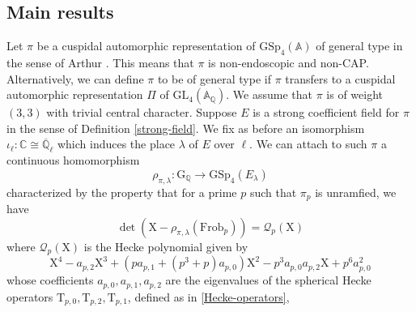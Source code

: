 \documentclass[10pt]{amsart}
\numberwithin{equation}{section}
\theoremstyle{definition}
\def\GL{\mathrm{GL}}
\def\GSp{\mathrm{GSp}}
\def\Frob{\mathrm{Frob}}
\def\calQ{\mathcal{Q}}
\def\CC{\mathbb{C}}
\def\QQ{\mathbb{Q}}
\def\ZZ{\mathbb{Z}}
\def\rmG{\mathrm{G}}
\def\rmX{\mathrm{X}}
\def\rmT{\mathrm{T}}
\begin{document}
\subsection{Main results} Let $\pi$ be a cuspidal automorphic representation of $\GSp_{4}(\mathbb{A})$ of general type in the sense of Arthur \cite{Arthur-GSp}. This means that $\pi$ is non-endoscopic and non-CAP. Alternatively, we can define $\pi$ to be of general type if $\pi$ transfers to a cuspidal automorphic representation $\Pi$ of $\GL_{4}(\mathbb{A}_{\QQ})$. We assume that $\pi$ is of weight $(3, 3)$ with trivial central character. Suppose $E$ is a strong coefficient field for $\pi$ in the sense of Definition \ref{strong-field}. We fix as before an isomorphism $\iota_{\ell}:\CC\cong\overline{\QQ}_{\ell}$ which induces the place $\lambda$ of $E$ over $\ell$. We can attach to such $\pi$ a continuous homomorphism
\begin{equation*}
\rho_{\pi,\lambda}: \rmG_{\QQ}\rightarrow\GSp_{4}(E_{\lambda})
\end{equation*}
characterized by the property that for a prime $p$ such that $\pi_{p}$ is unramfied, we have
\begin{equation*}
\det(\rmX-\rho_{\pi,\lambda}(\Frob_{p}))=\calQ_{p}(\rmX)
\end{equation*}
where $\calQ_{p}(\rmX)$ is the Hecke polynomial given by
\begin{equation*}
\rmX^{4}-a_{p,2}\rmX^{3}+(pa_{p,1}+(p^{3}+p)a_{p, 0})\rmX^{2}-p^{3}a_{p, 0}a_{p, 2}\rmX+p^{6}a^{2}_{p, 0}
\end{equation*}
whose coefficients $a_{p, 0}, a_{p, 1}, a_{p, 2}$ are the eigenvalues of the spherical Hecke operators $\rmT_{p,0}, \rmT_{p,2}, \rmT_{p,1}$, defined as in \ref{Hecke-operators}, 
\end{document}
